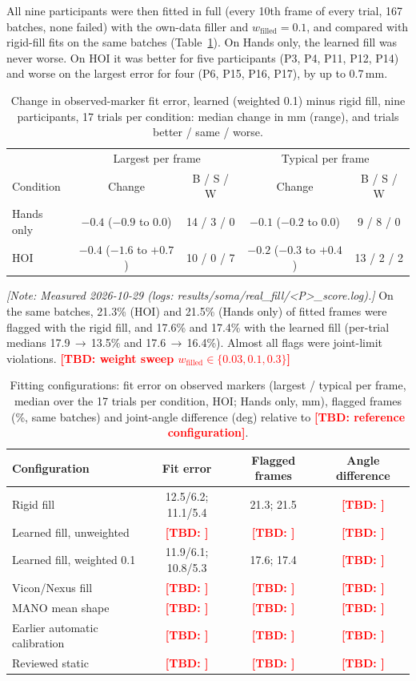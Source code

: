 \documentclass[11pt,a4paper]{article}
\newcommand{\tbd}[1]{\textcolor{red}{\textbf{[TBD: #1]}}}
\newcommand{\note}[1]{\textcolor{orange!80!black}{\textit{[Note: #1]}}}
\begin{document}
All nine participants were then fitted in full (every 10th frame of every trial, 167 batches, none failed) with the
own-data filler and $w_\text{filled}=0.1$, and compared with rigid-fill fits on the same batches
(Table~\ref{tab:fit-cohort}). On Hands only, the learned fill was never worse. On HOI it was better for five
participants (P3, P4, P11, P12, P14) and worse on the largest error for four (P6, P15, P16, P17), by up to 0.7\,mm.
\begin{table}[h]\centering\small
\caption{Change in observed-marker fit error, learned (weighted 0.1) minus rigid fill, nine participants, 17 trials per
condition: median change in mm (range), and trials better / same / worse.}\label{tab:fit-cohort}
\begin{tabular}{lcccc}\toprule
 & \multicolumn{2}{c}{Largest per frame} & \multicolumn{2}{c}{Typical per frame} \\
Condition & Change & B / S / W & Change & B / S / W \\\midrule
Hands only & $-0.4$ ($-0.9$ to $0.0$) & 14 / 3 / 0 & $-0.1$ ($-0.2$ to $0.0$) & 9 / 8 / 0 \\
HOI & $-0.4$ ($-1.6$ to $+0.7$) & 10 / 0 / 7 & $-0.2$ ($-0.3$ to $+0.4$) & 13 / 2 / 2 \\\bottomrule
\end{tabular}
\end{table}
\note{Measured 2026-10-29 (logs: results/soma/real\_fill/<P>\_score.log).}
On the same batches, 21.3\% (HOI) and 21.5\% (Hands only) of fitted frames were flagged with the rigid fill, and
17.6\% and 17.4\% with the learned fill (per-trial medians 17.9\,$\rightarrow$\,13.5\% and 17.6\,$\rightarrow$\,16.4\%).
Almost all flags were joint-limit violations. \tbd{weight sweep $w_\text{filled} \in \{0.03, 0.1, 0.3\}$}

\begin{table}[h]\centering\small
\caption{Fitting configurations: fit error on observed markers (largest / typical per frame, median over the 17
trials per condition, HOI; Hands only, mm), flagged frames (\%, same batches) and joint-angle difference (deg) relative to
\tbd{reference configuration}.}\label{tab:bench-fit}
\begin{tabular}{lccc}\toprule
Configuration & Fit error & Flagged frames & Angle difference \\\midrule
Rigid fill & 12.5/6.2; 11.1/5.4 & 21.3; 21.5 & \tbd{} \\
Learned fill, unweighted & \tbd{} & \tbd{} & \tbd{} \\
Learned fill, weighted 0.1 & 11.9/6.1; 10.8/5.3 & 17.6; 17.4 & \tbd{} \\
Vicon/Nexus fill & \tbd{} & \tbd{} & \tbd{} \\
MANO mean shape & \tbd{} & \tbd{} & \tbd{} \\
Earlier automatic calibration & \tbd{} & \tbd{} & \tbd{} \\
Reviewed static & \tbd{} & \tbd{} & \tbd{} \\\bottomrule
\end{tabular}
\end{table}
\end{document}
